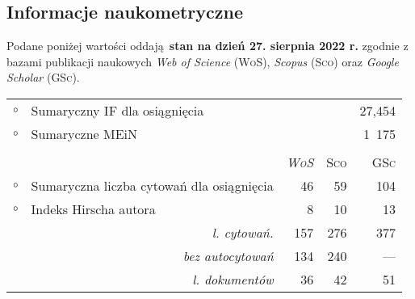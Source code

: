 \vfill
\newpage



\vfill

\subsection{Informacje naukometryczne}
Podane poniżej wartości oddają \textbf{stan na dzień 27. sierpnia 2022 r.} zgodnie z bazami publikacji naukowych \emph{Web of Science} (\textsc{WoS}), \emph{Scopus} (\textsc{Sco}) oraz \emph{Google Scholar} (\textsc{GSc}).

\vspace{4em}
\renewcommand{\arraystretch}{1.1}
\noindent\begin{tabular}{p{.9em}llrrr}
$\circ$ & \multicolumn{4}{l}{Sumaryczny IF dla osiągnięcia} & \multicolumn{1}{r}{27,454}\\

$\circ$ & \multicolumn{2}{l}{Sumaryczne MEiN} & & & \multicolumn{1}{r}{1~175}\\\\

& & & \textsc{\emph{WoS}} & \textsc{Sco} & \textsc{GSc}\\

$\circ$ & \multicolumn{2}{l}{Sumaryczna liczba cytowań dla osiągnięcia} & 46 & 59 & 104\\
$\circ$ & \multicolumn{2}{l}{Indeks Hirscha autora} & 8 & 10 & 13\\
 & & \multicolumn{1}{r}{\emph{l. cytowań.}} & 157 & 276 & 377\\
 & & \multicolumn{1}{r}{\emph{bez autocytowań}} & 134 & 240 & ---\\
 & & \multicolumn{1}{r}{\emph{l. dokumentów}} & 36 & 42 & 51\\
\end{tabular}


\vfill
